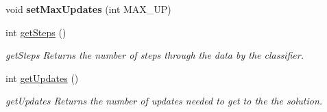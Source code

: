\begin{DoxyCompactItemize}
\item 
\mbox{\label{class_classifier_ad8930d5e6002299bdb840d4542229f02}} 
void {\bfseries set\+Max\+Updates} (int M\+A\+X\+\_\+\+UP)
\item 
int \hyperlink{class_classifier_a1fb3e4dfd80c154e89603c8fa1b11b76}{get\+Steps} ()
\begin{DoxyCompactList}\small\item\em get\+Steps Returns the number of steps through the data by the classifier. \end{DoxyCompactList}\item 
int \hyperlink{class_classifier_a738c2fbed982db6cad02062edcc037e4}{get\+Updates} ()
\begin{DoxyCompactList}\small\item\em get\+Updates Returns the number of updates needed to get to the the solution. \end{DoxyCompactList}\end{DoxyCompactItemize}

